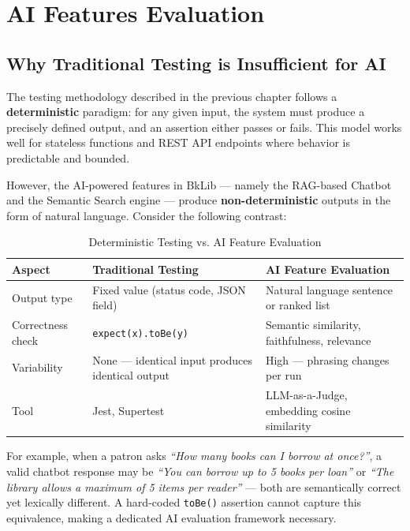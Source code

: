 \section{AI Features Evaluation}

\subsection{Why Traditional Testing is Insufficient for AI}

The testing methodology described in the previous chapter follows a \textbf{deterministic} paradigm: for any given input, the system must produce a precisely defined output, and an assertion either passes or fails. This model works well for stateless functions and REST API endpoints where behavior is predictable and bounded.

However, the AI-powered features in BkLib — namely the RAG-based Chatbot and the Semantic Search engine — produce \textbf{non-deterministic} outputs in the form of natural language. Consider the following contrast:

\begin{table}[H]
\centering
\caption{Deterministic Testing vs. AI Feature Evaluation}
\begin{tabularx}{\textwidth}{|p{3.5cm}|X|X|}
\hline
\textbf{Aspect} & \textbf{Traditional Testing} & \textbf{AI Feature Evaluation} \\
\hline
Output type & Fixed value (status code, JSON field) & Natural language sentence or ranked list \\
\hline
Correctness check & \texttt{expect(x).toBe(y)} & Semantic similarity, faithfulness, relevance \\
\hline
Variability & None — identical input produces identical output & High — phrasing changes per run \\
\hline
Tool & Jest, Supertest & LLM-as-a-Judge, embedding cosine similarity \\
\hline
\end{tabularx}
\end{table}

\noindent For example, when a patron asks \textit{``How many books can I borrow at once?''}, a valid chatbot response may be \textit{``You can borrow up to 5 books per loan''} or \textit{``The library allows a maximum of 5 items per reader''} — both are semantically correct yet lexically different. A hard-coded \texttt{toBe()} assertion cannot capture this equivalence, making a dedicated AI evaluation framework necessary.

